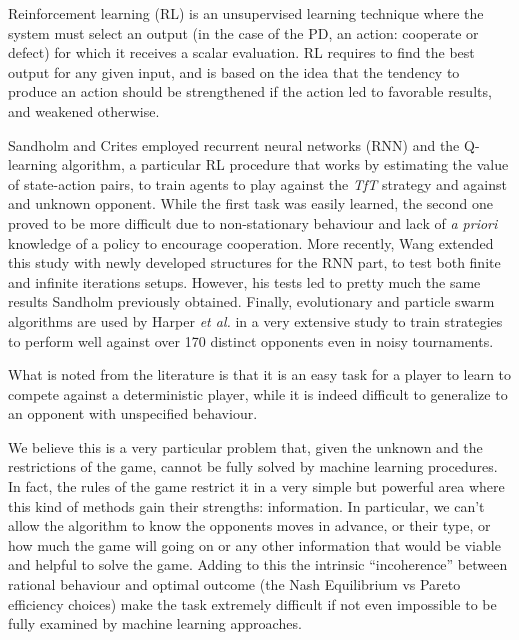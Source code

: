 \documentclass[journal,10pt,twoside]{IEEEtran}
\begin{document}
Reinforcement learning (RL) is an unsupervised learning technique where the system must select an output (in the case of the PD, an action: cooperate or defect) for which it receives a scalar evaluation. RL requires to find the best output for any given input, and is based on the idea that the tendency to produce an action should be strengthened if the action led to favorable results, and weakened otherwise. \cite{sandholmRL}

Sandholm and Crites \cite{sandholmRL} employed recurrent neural networks (RNN) and the Q-learning algorithm, a particular RL procedure that works by estimating the value of state-action pairs, to train agents to play against the \textit{TfT} strategy and against and unknown opponent. While the first task was easily learned, the second one proved to be more difficult due to non-stationary behaviour and lack of \textit{a priori} knowledge of a policy to encourage cooperation.
More recently, Wang \cite{kedaoRL} extended this study with newly developed structures for the RNN part, to test both finite and infinite iterations setups. However, his tests led to pretty much the same results Sandholm previously obtained.
Finally, evolutionary and particle swarm algorithms are used by Harper \textit{et al.} in a very extensive study \cite{plosRLdominant} to train strategies to perform well against over 170 distinct opponents even in noisy tournaments.

What is noted from the literature is that it is an easy task for a player to learn to compete against a deterministic player, while it is indeed difficult to generalize to an opponent with unspecified behaviour.

We believe this is a very particular problem that, given the unknown and the restrictions of the game, cannot be fully solved by machine learning procedures. In fact, the rules of the game restrict it in a very simple but powerful area where this kind of methods gain their strengths: information. In particular, we can't allow the algorithm to know the opponents moves in advance, or their type, or how much the game will going on or any other information that would be viable and helpful to solve the game. Adding to this the intrinsic ``incoherence'' between rational behaviour and optimal outcome (the Nash Equilibrium vs Pareto efficiency choices) make the task extremely difficult if not even impossible to be fully examined by machine learning approaches.
\end{document}
